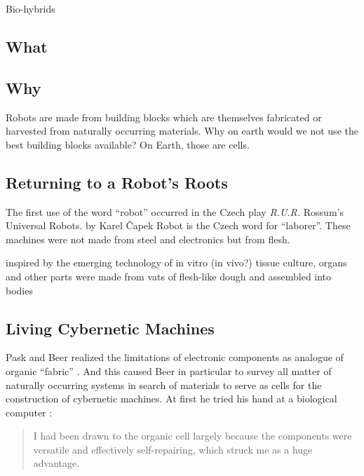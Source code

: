 Bio-hybrids \cite{cvetkovic2014three,raman2016optogenetic,nawroth2012tissue,park2016phototactic,ricotti2017biohybrid}



\subsection*{What}



\subsection*{Why}

Robots are made from building blocks which are themselves fabricated or harvested from naturally occurring materials.
Why on earth would we not use the best building blocks available?
On Earth, those are cells.


\subsection*{Returning to a Robot's Roots}

The first use of the word ``robot'' occurred in the Czech
play \textit{R.U.R.}
Rossum's Universal Robots.
by Karel \v{C}apek
Robot is the Czech word for ``laborer''.
These machines were not made from steel
and electronics
but from flesh.

\cite{ball2020living}

inspired by the emerging technology of 
in vitro (in vivo?) tissue culture,
organs and other parts were made from vats of flesh-like dough and assembled into bodies





\subsection*{Living Cybernetic Machines}

Pask and Beer realized the limitations of 
electronic components 
as analogue of organic ``fabric'' \cite{beer1960cybernetics}.
And this caused Beer in particular to survey all matter of naturally occurring systems in search of materials to serve as cells for the construction of cybernetic machines.
At first he tried his hand at a biological computer
\cite{beer1960cybernetics}:
\begin{quote}
\small
I had been drawn to the organic cell largely because the components were versatile and effectively self-repairing, which struck me as a huge advantage.
\end{quote}



